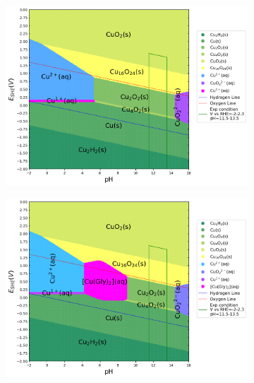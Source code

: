 \documentclass[journal=jacsat,manuscript=article]{achemso}
\begin{document}
\begin{figure}[htbp]
    \centering
    \begin{subfigure}[b]{0.3\textwidth}
        \subcaption{}\label{fig:Cu_Pourbaix_H2O}
        \includegraphics[width=\textwidth]{Figures/pourbaix_diagrams/Cu-NH3-H2O_activity=1e-04_[NH3]=0M_[Gly]=0M_[CN]=0.png}
        \par\medskip
    \end{subfigure}
    \begin{subfigure}[b]{0.3\textwidth}
        \subcaption{}\label{fig:Cu_Pourbaix_NH3_Gly}
        \includegraphics[width=\textwidth]{Figures/pourbaix_diagrams/Cu-NH3-H2O_activity=1e-04_[NH3]=0.02M_[Gly]=0.005M_[CN]=0.png}
        \par\medskip

\end{subfigure}
\end{figure}
\end{document}
